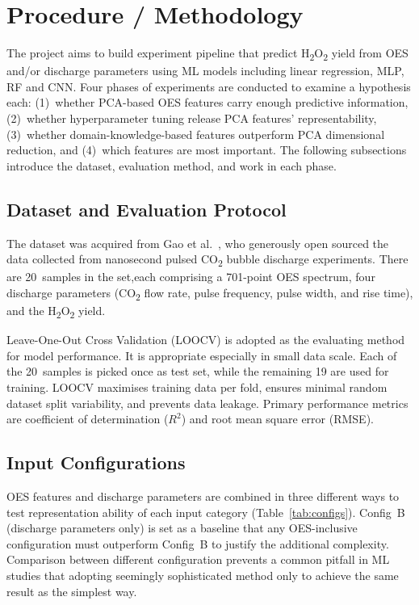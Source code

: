 \newpage
\section{Procedure / Methodology}
\label{sec:method}

The project aims to build experiment pipeline that predict  H\textsubscript{2}O\textsubscript{2} yield from OES and/or discharge parameters using ML models including linear regression, MLP, RF and CNN. Four phases of experiments are conducted to examine a hypothesis each: (1)~whether PCA-based OES features carry enough predictive information, (2)~whether hyperparameter tuning release PCA features' representability, (3)~whether domain-knowledge-based features outperform PCA dimensional reduction, and (4)~which features are most important. The following subsections introduce the dataset, evaluation method, and work in each phase.


\subsection{Dataset and Evaluation Protocol}
\label{sec:dataset}

The dataset was acquired from Gao et al.~\cite{Gao2024NSCO2Discharge}, who generously open sourced the data collected from nanosecond pulsed CO\textsubscript{2} bubble discharge experiments. There are 20~samples in the set,each comprising a 701-point OES spectrum, four discharge parameters (CO\textsubscript{2} flow rate, pulse frequency, pulse width, and rise time), and the H\textsubscript{2}O\textsubscript{2} yield.

Leave-One-Out Cross Validation (LOOCV) is adopted as the evaluating method for model performance. It is appropriate especially in small data scale. Each of the 20~samples is picked once as test set, while the remaining 19 are used for training. LOOCV maximises training data per fold, ensures minimal random dataset split variability, and prevents data leakage. Primary performance metrics are coefficient of determination ($R^2$) and root mean square error (RMSE). 


\subsection{Input Configurations}

OES features and discharge parameters are combined in three different ways to test representation ability of each input category (Table~\ref{tab:configs}). Config~B (discharge parameters only) is set as a baseline that any OES-inclusive configuration must outperform Config~B to justify the additional complexity. Comparison between different configuration prevents a common pitfall in ML studies that adopting seemingly sophisticated method only to achieve the same result as the simplest way.



